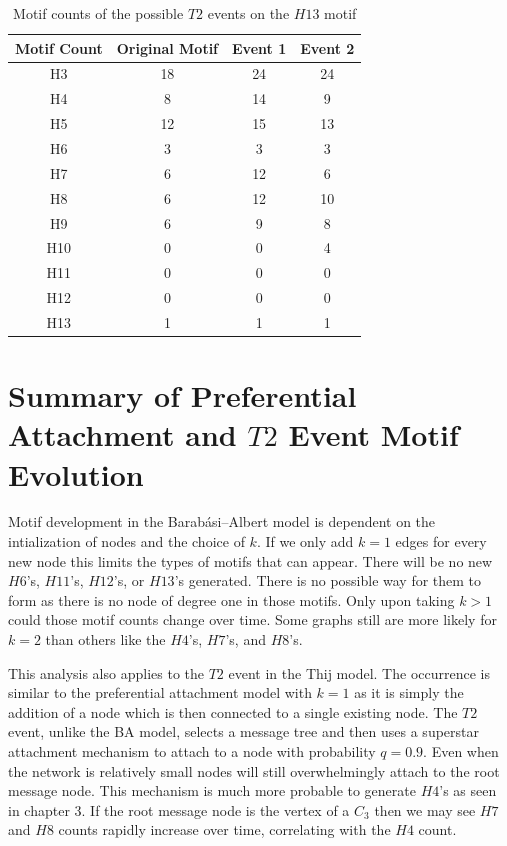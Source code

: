 \begin{table}
    \centering
    \begin{tabular}{||c c c c||} 
    \hline
    Motif Count & Original Motif & Event 1 & Event 2 \\ [0.5ex] 
    \hline\hline
    H3 & 18 & 24 & 24\\ 
    \hline
    H4 & 8 & 14 & 9  \\
    \hline
    H5 & 12 & 15 & 13  \\
    \hline
    H6 & 3 & 3 &3  \\
    \hline
    H7 & 6 & 12 & 6 \\
    \hline
    H8 & 6 & 12 & 10\\
    \hline
    H9 & 6 & 9 & 8 \\
    \hline
    H10 & 0 & 0 & 4  \\
    \hline
    H11 & 0 & 0 & 0  \\
    \hline
    H12 & 0 & 0 & 0 \\
    \hline
    H13 & 1 & 1 & 1 \\
    \hline
   \end{tabular}
   \caption{Motif counts of the possible $T2$ events on the $H13$ motif}
   \label{table:11}
\end{table}

\section{Summary of Preferential Attachment and $T2$ Event Motif Evolution}


Motif development in the Barabási–Albert model is dependent on the intialization of nodes and 
the choice of $k$. If we only add $k=1$ edges for every new node
this limits the types of motifs that can appear. There will be no new $H6$'s, $H11$'s,
$H12$'s, or $H13$'s generated. There is no possible way for them to form as there is no
node of degree one in those motifs. Only upon taking $k>1$ could those motif counts change over
 time. Some graphs still are more likely for $k=2$ than others like the $H4$'s, $H7$'s, and $H8$'s.

This analysis also applies to the $T2$ event in the Thij model. The occurrence is similar to
the preferential attachment model with $k=1$ as it is simply the addition of a node which is then
connected to a single existing node. The $T2$ event, unlike the BA model, selects a message tree 
and then uses a superstar attachment mechanism to attach to a node with probability $q=0.9$. Even when the network is relatively
small nodes will still overwhelmingly attach to the root message node. This mechanism is
much more probable to generate $H4$'s as seen in chapter 3. If the root
message node is the vertex of a $C_3$ then we may see $H7$ and $H8$ counts
rapidly increase over time, correlating with the $H4$ count. 

